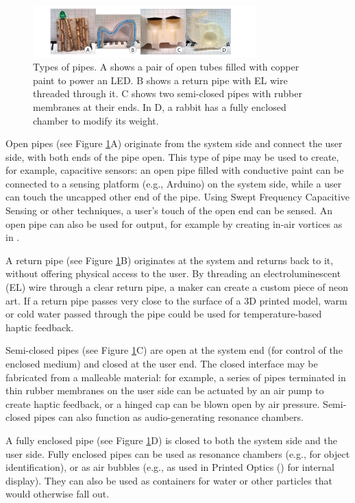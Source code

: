 \begin{figure}[h]
\centering
    \includegraphics[width=3.4in]{figures/types.png}
\caption{Types of pipes.  A shows a pair of open tubes filled with copper paint to power an LED.  B shows a return pipe with EL wire threaded through it.  C shows two semi-closed pipes with rubber membranes at their ends.  In D, a rabbit has a fully enclosed chamber to modify its weight. }
\label{fig:pipespace}
\end{figure}

Open pipes (see Figure \ref{fig:pipespace}A) originate from the system side and connect the user side, with both ends of the pipe open. This type of pipe may be used to create, for example, capacitive sensors: an open pipe filled with conductive paint can be connected to a sensing platform (e.g., Arduino) on the system side, while a user can touch the uncapped other end of the pipe.  Using Swept Frequency Capacitive Sensing \cite{Sato-touche} or other techniques, a user's touch of the open end can be sensed.  An open pipe can also be used for output, for example by creating in-air vortices as in \cite{Sodhi-aireal}.

A return pipe (see Figure \ref{fig:pipespace}B) originates at the system and returns back to it, without offering physical access to the user.  By threading an electroluminescent (EL) wire through a clear return pipe, a maker can create a custom piece of neon art.  If a return pipe passes very close to the surface of a 3D printed model, warm or cold water passed through the pipe could be used for temperature-based haptic feedback.

Semi-closed pipes (see Figure \ref{fig:pipespace}C) are open at the system end (for control of the enclosed medium) and closed at the user end.  The closed interface  may be fabricated from a malleable material: for example, a series of pipes terminated in thin rubber membranes on the user side can be actuated by an air pump to create haptic feedback, or a hinged cap can be blown open by air pressure.  Semi-closed pipes can also function as audio-generating resonance chambers.

A fully enclosed pipe (see Figure \ref{fig:pipespace}D) is closed to both the system side and the user side.  Fully enclosed pipes can be used as resonance chambers (e.g., for object identification), or as air bubbles (e.g., as used in Printed Optics (\cite{Willis-printedoptics}) for internal display).  They can also be used as containers for water or other particles that would otherwise fall out.

